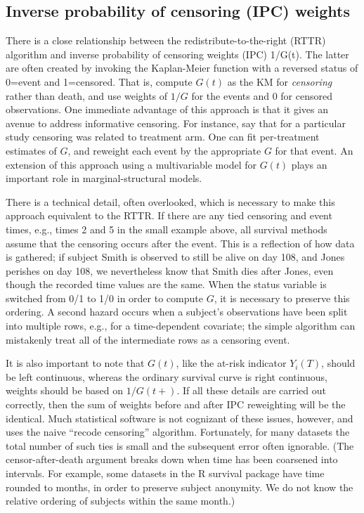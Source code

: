 \documentclass{article}\usepackage[]{graphicx}\usepackage[]{xcolor}
\begin{document}
\subsection{Inverse probability of censoring (IPC) weights}
\label{sect:ipcweight}
There is a close relationship between the 
redistribute-to-the-right (RTTR) algorithm and inverse probability of censoring
weights (IPC) 1/G(t). 
The latter are often created by invoking the Kaplan-Meier function with a 
reversed status of 0=event and 1=censored.
That is, compute $G(t)$ as the KM for \emph{censoring} rather than death,
and use weights of $1/G$ for the events and 0 for censored observations.
One immediate advantage of this approach is that it gives an avenue to
address informative censoring.  
For instance, say that for a particular study censoring was related to
treatment arm.  One can fit per-treatment estimates of $G$, and reweight
each event by the appropriate $G$ for that event.
An extension of this approach using a multivariable model for $G(t)$ plays
an important role in marginal-structural models.

There is a technical detail, often overlooked, which is necessary
to make this approach equivalent to the RTTR.
If there are any tied censoring and event times, e.g., times 2 and 5 in
the small example above, all survival methods assume that the censoring
occurs after the event.
This is a reflection of how data is gathered; if subject Smith is observed
to still be alive on day 108, and Jones perishes on day 108, we nevertheless know
that Smith dies after Jones, even though the recorded time values are the same.
When the status variable is switched from 0/1 to 1/0 in order to compute $G$,
it is necessary to preserve this ordering.
A second hazard occurs 
when a subject's observations have been split into multiple rows, e.g., for
a time-dependent covariate; the simple algorithm can
mistakenly treat all of the intermediate rows
as a censoring event.

It is also important to note that $G(t)$, like the at-risk indicator $Y_i(T)$,
should be left continuous, whereas the ordinary survival curve is right
continuous, weights should be based on $1/G(t+)$.  
If all these details are carried out correctly, then the sum
of weights before and after IPC reweighting will be the identical.   
Much statistical software is not cognizant of these issues,
however, and uses the naive ``recode censoring'' algorithm.
Fortunately, for many datasets the total number of such ties is small and
the subsequent error often ignorable.  
(The censor-after-death argument breaks down
when time has been coarsened into intervals.
For example, some datasets in the R survival package have time rounded to 
months, in order to preserve subject anonymity. We do not know the relative
ordering of subjects within the same month.)
\end{document}
